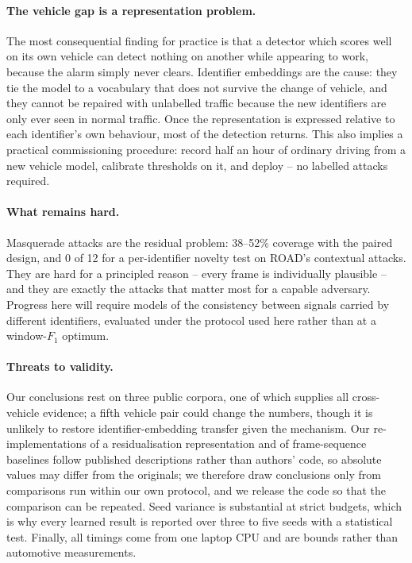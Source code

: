 \documentclass[preprint,11pt,authoryear]{elsarticle}
\begin{document}
\paragraph{The vehicle gap is a representation problem.} The most consequential finding for practice
is that a detector which scores well on its own vehicle can detect nothing on another while appearing
to work, because the alarm simply never clears. Identifier embeddings are the cause: they tie the
model to a vocabulary that does not survive the change of vehicle, and they cannot be repaired with
unlabelled traffic because the new identifiers are only ever seen in normal traffic. Once the
representation is expressed relative to each identifier's own behaviour, most of the detection
returns. This also implies a practical commissioning procedure: record half an hour of ordinary
driving from a new vehicle model, calibrate thresholds on it, and deploy -- no labelled attacks
required.

\paragraph{What remains hard.} Masquerade attacks are the residual problem: 38--52\% coverage with
the paired design, and 0 of 12 for a per-identifier novelty test on ROAD's contextual attacks. They
are hard for a principled reason -- every frame is individually plausible -- and they are exactly the
attacks that matter most for a capable adversary. Progress here will require models of the
consistency between signals carried by different identifiers, evaluated under the protocol used
here rather than at a window-$F_1$ optimum.

\paragraph{Threats to validity.} Our conclusions rest on three public corpora, one of which supplies
all cross-vehicle evidence; a fifth vehicle pair could change the numbers, though it is unlikely to
restore identifier-embedding transfer given the mechanism. Our re-implementations of a
residualisation representation and of frame-sequence baselines follow published descriptions rather
than authors' code, so absolute values may differ from the originals; we therefore draw conclusions
only from comparisons run within our own protocol, and we release the code so that the comparison can
be repeated. Seed variance is substantial at strict budgets, which is why every learned result is
reported over three to five seeds with a statistical test. Finally, all timings come from one laptop
CPU and are bounds rather than automotive measurements.
\end{document}
